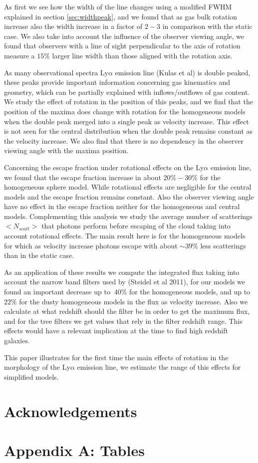 \documentclass[usenatbib]{mn2e}
\begin{document}
As first we see how the width of the line changes using a modified FWHM
explained in section \ref{sec:widthpeak}, and we found that as gas bulk 
rotation increase also the width increase in a factor of $2-3$ in comparison 
with the static case. We also take into account the influence of the observer 
viewing angle, we found that observers with a line of sight perpendicular  
to the axis of rotation measure a $15\%$ larger line width than those 
aligned with the rotation axis.

As many observational spectra Ly$\alpha$ emission line (Kulas et al) is double 
peaked, these peaks provide important information concerning gas kinematics and geometry, 
which can be partially explained with inflows/outflows of gas content. 
We study the effect of rotation in the position of this peaks, and we find 
that the position of the maxima does change with rotation for the homogeneous 
models when the double peak merged into a single peak as velocity increase. 
This effect is not seen for the central distribution when the double peak 
remains constant as the velocity increase. We also find that there is no 
dependency in the observer viewing angle with the maxima position.

Concerning the escape fraction under rotational effects on the Ly$\alpha$ 
emission line, we found that the escape fraction increase in about $20\%-30\%$
for the homogeneous sphere model. While rotational effects are negligible for
the central models and the escape fraction remains constant. Also the observer
viewing angle have no effect in the escape fraction neither for the homogeneous
and central models. Complementing this analysis we study the average number of 
scatterings $<N_{scatt}>$ that photons perform before escaping of the cloud
taking into account rotational effects. The main result here is for the homogeneous
models for which as velocity increase photons escape with about $\sim 39\%$ 
less scatterings than in the static case.

As an application of these results we compute the integrated flux taking 
into account the narrow band filters used by (Steidel et al 2011), for 
our models we found an important decrease up to $~40\%$ for the homogeneous models, 
and up to $22\%$ for the dusty homogeneous models in the flux as velocity increase. 
Also we calculate at what redshift should the filter be in order to get the maximum 
flux, and for the tree filters we get values that rely in the filter redshift range.
This effects would have a relevant implication at the time to find high redshift 
galaxies.

This paper illustrates for the first time the main effects of rotation in  
the morphology of the Ly$\alpha$ emission line, we estimate the range of this effects
for simplified models.


\section*{Acknowledgements}


 

\section*{Appendix A: Tables}
\end{document}

